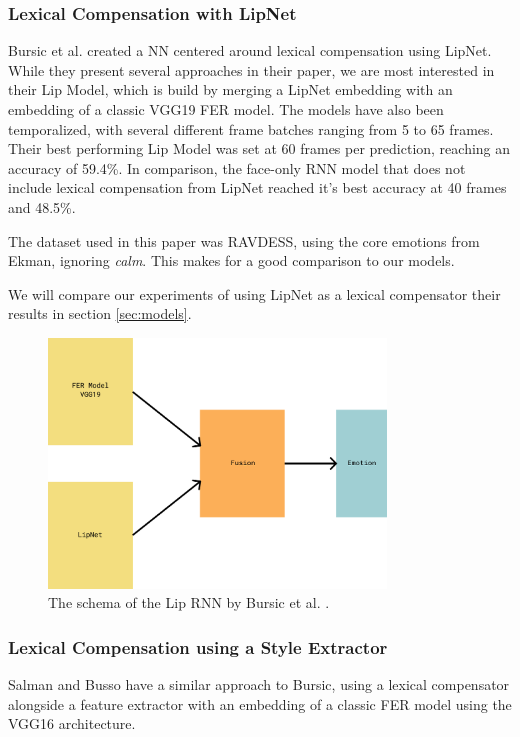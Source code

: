\subsubsection{Lexical Compensation with LipNet}
\label{sub:lip}
Bursic et al. \cite{bursic2020improving} created a NN centered around lexical compensation using LipNet. While they present several approaches in their paper, we are most interested in their Lip Model, which is build by merging a LipNet embedding with an embedding of a classic VGG19 FER model. The models have also been temporalized, with several different frame batches ranging from 5 to 65 frames. Their best performing Lip Model was set at 60 frames per prediction, reaching an accuracy of 59.4\%. In comparison, the face-only RNN model that does not include lexical compensation from LipNet reached it's best accuracy at 40 frames and 48.5\%.

The dataset used in this paper was RAVDESS, using the core emotions from Ekman, ignoring \emph{calm}. This makes for a good comparison to our models.

We will compare our experiments of using LipNet as a lexical compensator their results in section \ref{sec:models}.

\begin{figure}
    \centering
    \includegraphics[width=0.8\textwidth]{res/lipnetpng.png}
    \caption{The schema of the Lip RNN by Bursic et al. \cite{bursic2020improving}.}
    \label{fig:bursic_schema}
\end{figure}

\subsubsection{Lexical Compensation using a Style Extractor}
\label{sub:style}
Salman and Busso \cite{salman2020style} have a similar approach to Bursic, using a lexical compensator alongside a feature extractor with an embedding of a classic FER model using the VGG16 architecture.

